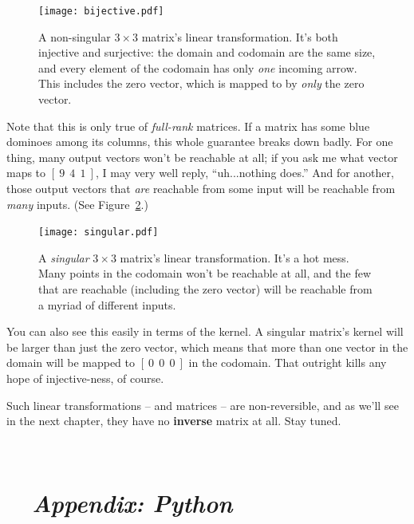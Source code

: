 \begin{figure}[hb]
\centering
\texttt{[image: bijective.pdf]}
\caption{A non-singular $3\times 3$ matrix's linear transformation. It's both
injective and surjective: the domain and codomain are the same size, and every
element of the codomain has only \textit{one} incoming arrow. This includes the
zero vector, which is mapped to by \textit{only} the zero vector.}
\label{fig:bijective}
\end{figure}

Note that this is only true of \textit{full-rank} matrices. If a matrix has
some blue dominoes among its columns, this whole guarantee breaks down badly.
For one thing, many output vectors won't be reachable at all; if you ask me
what vector maps to $[\ 9\ \ 4\ \ 1\ ]$, I may very well reply,
``uh...nothing does.'' And for another, those output vectors that \textit{are}
reachable from some input will be reachable from \textit{many} inputs. (See
Figure~\ref{fig:singular}.)

\begin{figure}[ht]
\centering
\texttt{[image: singular.pdf]}
\caption{A \textit{singular} $3\times 3$ matrix's linear transformation. It's a
hot mess. Many points in the codomain won't be reachable at all, and the few
that are reachable (including the zero vector) will be reachable from a myriad
of different inputs.}
\label{fig:singular}
\end{figure}


You can also see this easily in terms of the kernel. A singular matrix's kernel
will be larger than just the zero vector, which means that more than one vector
in the domain will be mapped to $[\ 0\ \ 0\ \ 0\ ]$ in the codomain. That
outright kills any hope of injective-ness, of course.


Such linear transformations -- and matrices -- are non-reversible, and as we'll
see in the next chapter, they have no \textbf{inverse} matrix at all. Stay
tuned.

\vspace{.1in}
\hrulefill \\

\pagebreak

\section*{\faPython \ \ \textit{Appendix: Python}}

